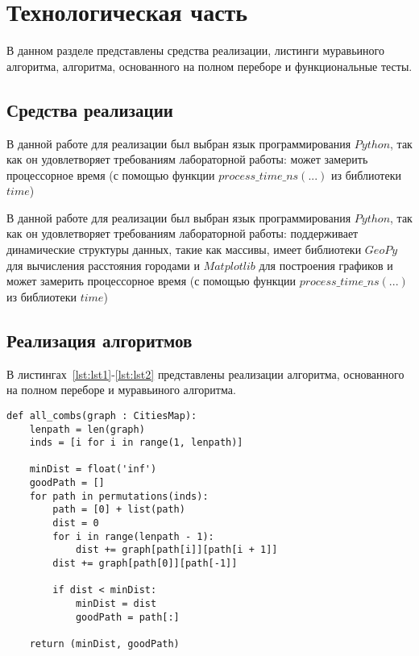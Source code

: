 \chapter{Технологическая часть}

В данном разделе представлены средства реализации, листинги муравьиного алгоритма, алгоритма, основанного на полном переборе и функциональные тесты.

\section{Средства реализации}
В данной работе для реализации был выбран язык программирования $Python$\cite{python-city}, так как он удовлетворяет требованиям лабораторной работы: может замерить процессорное время (с помощью функции $process\_time\_ns(...)$ из библиотеки $time$\cite{python-time})

В данной работе для реализации был выбран язык программирования $Python$\cite{python-city}, так как он удовлетворяет требованиям лабораторной работы: поддерживает динамические структуры данных,
такие как массивы, имеет библиотеки $GeoPy$\cite{GeoPy} для вычисления расстояния городами и  $Matplotlib$\cite{matplotlib-lib} для построения графиков и может замерить процессорное время (с помощью функции $process\_time\_ns(...)$ из библиотеки $time$\cite{python-time})


\section{Реализация алгоритмов}
В листингах~\ref{lst:lst1}-\ref{lst:lst2} представлены реализации алгоритма, основанного на полном переборе и муравьиного алгоритма.

\begin{center}
	\captionsetup{justification=raggedright,singlelinecheck=off}
	\renewcommand{\lstlistingname}{Листинг}
	\begin{lstlisting}[label=lst:lst1,caption=Реализация алгоритма основанного на полном переборе]
def all_combs(graph : CitiesMap):
	lenpath = len(graph)
	inds = [i for i in range(1, lenpath)]
	
	minDist = float('inf')
	goodPath = []
	for path in permutations(inds):
		path = [0] + list(path)
		dist = 0
		for i in range(lenpath - 1):
			dist += graph[path[i]][path[i + 1]]
		dist += graph[path[0]][path[-1]]
		
		if dist < minDist:
			minDist = dist
			goodPath = path[:]
	
	return (minDist, goodPath)
	\end{lstlisting}
\end{center}

